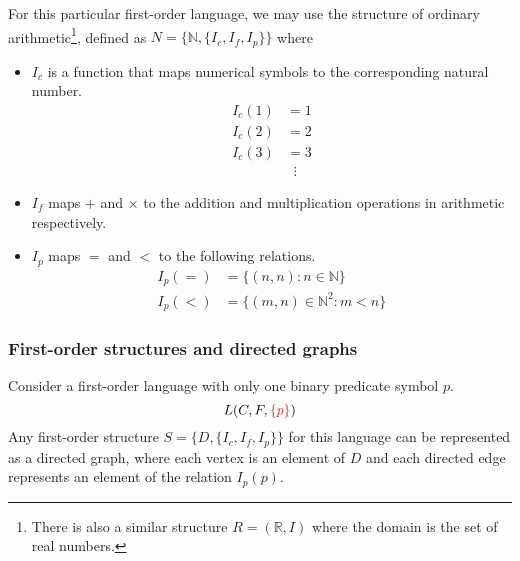 For this particular first-order language, we may use the structure of ordinary arithmetic\footnote{There is also a similar structure \(R = (\mathbb{R}, I)\) where the domain is the set of real numbers.}, defined as \(N = \{\mathbb{N}, \{I_c, I_f, I_p\}\}\) where
%
\begin{itemize}
    \item \(I_c\) is a function that maps numerical symbols to the corresponding natural number.
    \begin{align*}
        I_c (1) &= 1\\
        I_c (2) &= 2\\
        I_c (3) &= 3\\
        &\;\;\vdots
    \end{align*}

    \item \(I_f\) maps \(+\) and \(\times\) to the addition and multiplication operations in arithmetic respectively.
    
    \item \(I_p\) maps \(=\) and \(<\) to the following relations.
    \begin{align*}
        I_p (=) &= \{(n, n) : n \in \mathbb{N}\}\\
        I_p (<) &= \{(m, n) \in \mathbb{N}^2 : m < n\}
    \end{align*}
\end{itemize}



\subsubsection{First-order structures and directed graphs}

Consider a first-order language with only one binary predicate symbol \(p\).
%
\[L(C, F, {\color{BrickRed} \{p\}})\]
%
Any first-order structure \(S = \{D, \{I_c, I_f, I_p\}\}\) for this language can be represented as a directed graph, where each vertex is an element of \(D\) and each directed edge represents an element of the relation \(I_p (p)\).

